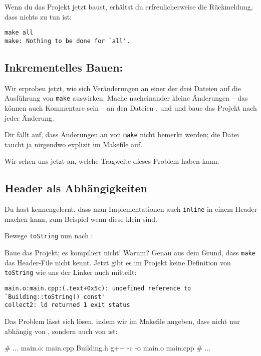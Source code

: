 Wenn du das Projekt jetzt baust, erhältst du erfreulicherweise die Rückmeldung, dass nichts zu tun ist:
\begin{verbatim}
make all
make: Nothing to be done for `all'.
\end{verbatim}

\subsection{Inkrementelles Bauen:}
Wir erproben jetzt, wie sich Veränderungen an einer der drei Dateien auf die Ausführung von \texttt{make} auswirken.
Mache nacheinander kleine Änderungen -- das können auch Kommentare sein -- an den Dateien ,  und  und baue das Projekt nach jeder Änderung.

Dir fällt auf, dass Änderungen an  von \texttt{make} nicht bemerkt werden; die Datei taucht ja nirgendwo explizit im Makefile auf.

Wir sehen uns jetzt an, welche Tragweite dieses Problem haben kann.

\subsection{Header als Abhängigkeiten}
Du hast kennengelernt, dass man Implementationen auch \texttt{inline} in einem Header machen kann, zum Beispiel wenn diese klein sind.

Bewege \lstinline{toString} nun nach :

Baue das Projekt; es kompiliert nicht! Warum? Genau aus dem Grund, dass \texttt{make} das Header-File nicht \glqq kennt\grqq{}.
Jetzt gibt es im Projekt keine Definition von \lstinline{toString} wie uns der Linker auch mitteilt:

\begin{minipage}{\textwidth}
\begin{verbatim}
main.o:main.cpp:(.text+0x5c): undefined reference to `Building::toString() const'
collect2: ld returned 1 exit status
\end{verbatim}
\end{minipage}

Das Problem lässt sich lösen, indem wir im Makefile angeben, dass  nicht nur abhängig von , sondern auch von  ist:
\begin{lstmake}
# ...
main.o: main.cpp Building.h
    g++ -c -o main.o main.cpp
# ...
\end{lstmake}

